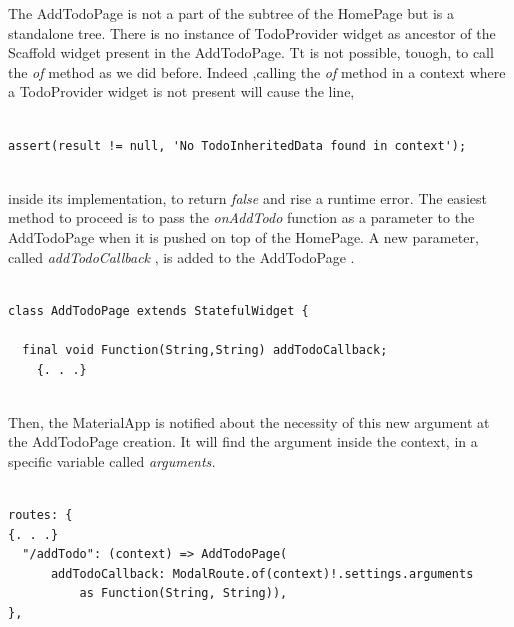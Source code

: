The AddTodoPage is not a part of the subtree of the HomePage but is a standalone tree. There is no instance of TodoProvider widget as ancestor of the  Scaffold widget present in the AddTodoPage. Tt is not possible, touogh, to call the \textit{of} method as  we did before. Indeed ,calling the \textit{of} method in a context where a TodoProvider widget is not present will cause the line,
\mbox{}\\

\begin{code}
\begin{verbatim}

assert(result != null, 'No TodoInheritedData found in context');
\end{verbatim}
\end{code}
\mbox{}\\
inside its implementation, to return \textit{false} and rise a runtime error. The easiest method to proceed is to pass the \textit{onAddTodo} function as a parameter to the AddTodoPage when it is pushed on top of the HomePage. A new parameter, called \textit{addTodoCallback }, is added to the AddTodoPage .
\mbox{}\\
\mbox{}
\begin{code}
\label{code:2.34}
\begin{verbatim}

class AddTodoPage extends StatefulWidget {

  final void Function(String,String) addTodoCallback;
    {. . .}
\end{verbatim}
\end{code}
\mbox{}\\
Then, the MaterialApp is notified about the necessity of this new argument at the AddTodoPage creation. It will find the argument inside the context, in a specific variable called \textit{arguments.}
\mbox{}\\
\mbox{}
\begin{code}
\label{code:2.36}
\begin{verbatim}

routes: {
{. . .}
  "/addTodo": (context) => AddTodoPage(
      addTodoCallback: ModalRoute.of(context)!.settings.arguments
          as Function(String, String)),
},

\end{verbatim}
\end{code}
